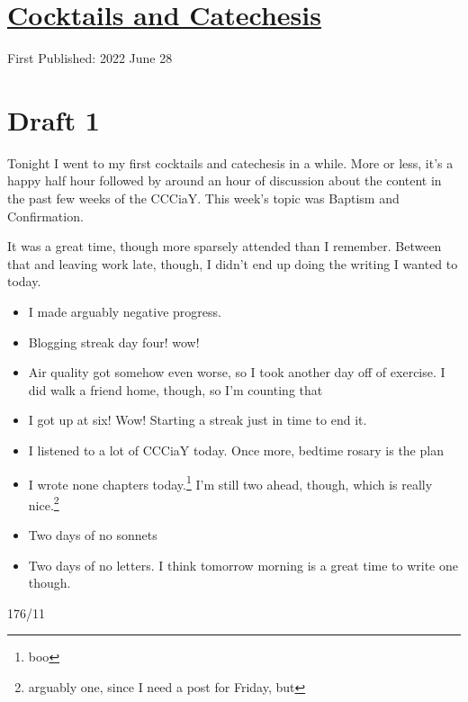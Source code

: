 \documentclass[12pt]{article}[titlepage]
\newcommand{\1}{\={a}}
\newcommand{\2}{\={e}}
\newcommand{\3}{\={\i}}
\newcommand{\4}{\=o}
\newcommand{\5}{\=u}
\newcommand{\6}{\={A}}
\renewcommand{\,}{\textsuperscript{,}}
\begin{document}
\doublespacing
\section{\href{cocktail-catechesis.html}{Cocktails and Catechesis}}
First Published: 2022 June 28


\section{Draft 1}
Tonight I went to my first cocktails and catechesis in a while.
More or less, it's a happy half hour followed by around an hour of discussion about the content in the past few weeks of the CCCiaY.
This week's topic was Baptism and Confirmation.

It was a great time, though more sparsely attended than I remember.
Between that and leaving work late, though, I didn't end up doing the writing I wanted to today.

\begin{itemize}
\item I made arguably negative progress.
\item Blogging streak day four! wow!
\item Air quality got somehow even worse, so I took another day off of exercise. I did walk a friend home, though, so I'm counting that
\item I got up at six! Wow! Starting a streak just in time to end it.
\item I listened to a lot of CCCiaY today. Once more, bedtime rosary is the plan
\item I wrote none chapters today.\footnote{boo} I'm still two ahead, though, which is really nice.\footnote{arguably one, since I need a post for Friday, but}
\item Two days of no sonnets
\item Two days of no letters. I think tomorrow morning is a great time to write one though.
\end{itemize}
176/11
\end{document}
